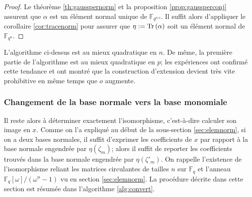 \documentclass[a4paper]{article} %
\numberwithin{section}{part}
\numberwithin{equation}{section}
\newcommand\GF[1]{\mathbb{F}_{#1}}
\newcommand\Tr[1]{\textup{Tr}\left(#1\right)}
\begin{document}
\begin{proof}
Le théorème \ref{th:gausspernorm} et la proposition \ref{prop:gaussperconj}
assurent que $\alpha$ est un élément normal unique de $\GF{q^{n.o}}$. Il suffit 
alors d'appliquer le corollaire \ref{cor:tracenorm} pour assurer que $\eta :=
\Tr{\alpha}$ soit un élément normal de $\GF{q^n}$.
\end{proof}
\begin{rem}
L'algorithme ci-dessus est au mieux quadratique en $n$. De même, la première
partie de l'algorithme est au mieux quadratique en $p$; les expériences ont
confirmé cette tendance et ont montré que la construction d'extension devient
très vite prohibitive en même temps que $o$ augmente.
\end{rem}

\subsubsection*{Changement de la base normale vers la base monomiale}
Il reste alors à déterminer exactement l'isomorphisme, c'est-à-dire calculer son
image en $x$. Comme on l'a expliqué au début de la sous-section
\ref{sec:elemnorm}, si on a deux bases normales, il suffit d'exprimer les 
coefficients de $x$ par rapport à la base normale engendrée par $\eta(\zeta_m)$;
alors il suffit de reporter les coefficients trouvés dans la base normale 
engendrée par $\eta(\zeta'_m)$. On rappelle l'existence de l'isomorphisme 
reliant les matrices circulantes de tailles $n$ sur $\GF{q}$ et l'anneau 
$\GF{q}[\omega]/(\omega^n - 1)$ vu en section \ref{sec:elemnorm}. La procédure
décrite dans cette section est résumée dans l'algorithme \ref{alg:convert}.
\end{document}
